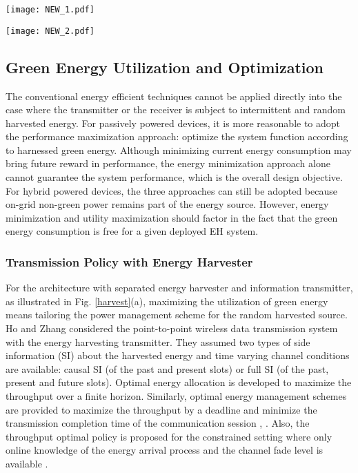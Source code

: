 \documentclass[journal,12pt,onecolumn]{IEEEtran}
\begin{document}
\begin{figure*}
\texttt{[image: NEW\_1.pdf]}\caption{The harvest-store-use mechanism of cognitive device.}
\label{harvest}
\end{figure*}



\begin{figure*}
\texttt{[image: NEW\_2.pdf]}\caption{The RF energy harvesting mechanism.}
\label{powersplitting}
\end{figure*}




\subsection{Green Energy Utilization and Optimization}
The conventional energy efficient techniques cannot be applied directly into the case where the transmitter or the receiver is subject to intermittent and random harvested energy. For passively powered devices, it is more reasonable to adopt the performance maximization approach: optimize the system function according to harnessed green energy. Although minimizing current energy consumption may bring future reward in performance, the energy minimization approach alone cannot guarantee the system performance, which is the overall design objective. For hybrid powered devices, the three approaches can still be adopted because on-grid non-green power remains part of the energy source. However, energy minimization and utility maximization should factor in the fact that the green energy consumption is free for a given deployed EH system.


\subsubsection{Transmission Policy with Energy Harvester}
For the architecture with separated energy harvester and information transmitter, as illustrated in Fig. \ref{harvest}(a), maximizing the utilization of green energy means tailoring the power management scheme for the random harvested source. Ho and Zhang \cite{6202352} considered the point-to-point wireless data transmission system with the energy harvesting transmitter. They assumed two types of side information (SI) about the harvested energy and time varying channel conditions are available: causal SI (of the past and present slots) or full SI (of the past, present and future slots). Optimal energy allocation is developed to maximize the throughput over a finite horizon. Similarly, optimal energy management schemes are provided to maximize the throughput by a deadline and minimize the transmission completion time of the communication session \cite{5441354}, \cite{5992841}. Also, the throughput optimal policy is proposed for the constrained setting where only online knowledge of the energy arrival process and the channel fade level is available \cite{5992841}.
\end{document}
